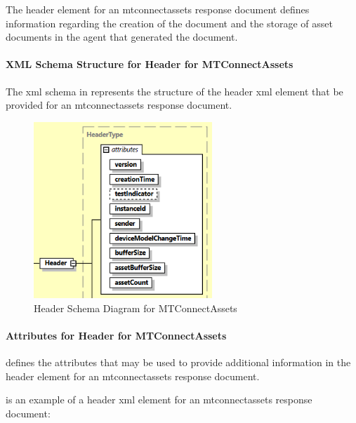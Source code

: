 The \gls{header} element for an \gls{mtconnectassets response document} defines information regarding the creation of the document and the storage of \glspl{asset document} in the \gls{agent} that generated the document.  

\paragraph{XML Schema Structure for Header for MTConnectAssets}\mbox{}

The \gls{xml schema} in  represents the structure of the \gls{header} \gls{xml} element that \MUST be provided for an \gls{mtconnectassets response document}.  

\begin{figure}[ht]
  \centering
  \includegraphics[width=0.6\textwidth]{figures/header-schema-diagram-for-mtconnectassets.png}
  \caption{Header Schema Diagram for MTConnectAssets}
  \label{fig:header-schema-diagram-for-mtconnectassets}
\end{figure}

\FloatBarrier

\paragraph{Attributes for Header for MTConnectAssets}\mbox{}

 defines the attributes that may be used to provide additional information in the \gls{header} element for an \gls{mtconnectassets response document}.



 is an example of a \gls{header} \gls{xml} element for an \gls{mtconnectassets response document}:

